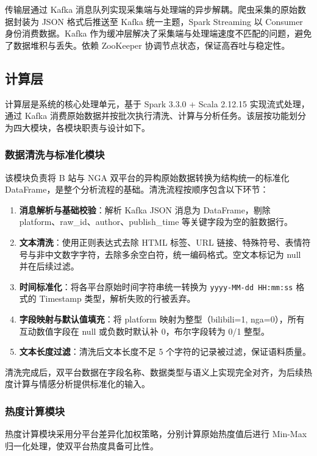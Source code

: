 传输层通过 Kafka 消息队列实现采集端与处理端的异步解耦。爬虫采集的原始数据封装为 JSON 格式后推送至 Kafka 统一主题，Spark Streaming 以 Consumer 身份消费数据。Kafka 作为缓冲层解决了采集端与处理端速度不匹配的问题，避免了数据堆积与丢失。依赖 ZooKeeper 协调节点状态，保证高吞吐与稳定性。

\subsection{计算层}

计算层是系统的核心处理单元，基于 Spark 3.3.0 + Scala 2.12.15 实现流式处理，通过 Kafka 消费原始数据并按批次执行清洗、计算与分析任务。该层按功能划分为四大模块，各模块职责与设计如下。

\subsubsection{数据清洗与标准化模块}

该模块负责将 B 站与 NGA 双平台的异构原始数据转换为结构统一的标准化 DataFrame，是整个分析流程的基础。清洗流程按顺序包含以下环节：

\begin{enumerate}
    \item \textbf{消息解析与基础校验}：解析 Kafka JSON 消息为 DataFrame，剔除 platform、raw\_id、author、publish\_time 等关键字段为空的脏数据行。
    \item \textbf{文本清洗}：使用正则表达式去除 HTML 标签、URL 链接、特殊符号、表情符号与非中文数字字符，去除多余空白符，统一编码格式。空文本标记为 null 并在后续过滤。
    \item \textbf{时间标准化}：将各平台原始时间字符串统一转换为 \texttt{yyyy-MM-dd HH:mm:ss} 格式的 Timestamp 类型，解析失败的行被丢弃。
    \item \textbf{字段映射与默认值填充}：将 platform 映射为整型（bilibili=1, nga=0），所有互动数值字段在 null 或负数时默认补 0，布尔字段转为 0/1 整型。
    \item \textbf{文本长度过滤}：清洗后文本长度不足 5 个字符的记录被过滤，保证语料质量。
\end{enumerate}

清洗完成后，双平台数据在字段名称、数据类型与语义上实现完全对齐，为后续热度计算与情感分析提供标准化的输入。

\subsubsection{热度计算模块}

热度计算模块采用分平台差异化加权策略，分别计算原始热度值后进行 Min-Max 归一化处理，使双平台热度具备可比性。

